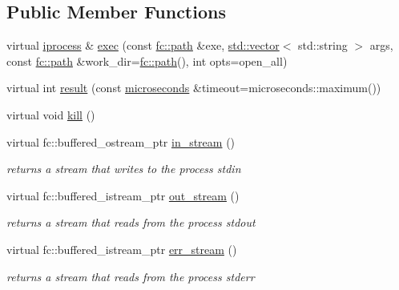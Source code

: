 \subsection*{Public Member Functions}
\begin{DoxyCompactItemize}
\item 
virtual \mbox{\hyperlink{classfc_1_1iprocess}{iprocess}} \& \mbox{\hyperlink{classfc_1_1process_aa663b2fe8d58228224d0c1a954554a46}{exec}} (const \mbox{\hyperlink{classfc_1_1path}{fc\+::path}} \&exe, \mbox{\hyperlink{classstd_1_1vector}{std\+::vector}}$<$ std\+::string $>$ args, const \mbox{\hyperlink{classfc_1_1path}{fc\+::path}} \&work\+\_\+dir=\mbox{\hyperlink{classfc_1_1path}{fc\+::path}}(), int opts=open\+\_\+all)
\item 
virtual int \mbox{\hyperlink{classfc_1_1process_a58711b1b058e41f8139a971d3cc9b0a4}{result}} (const \mbox{\hyperlink{classfc_1_1microseconds}{microseconds}} \&timeout=microseconds\+::maximum())
\item 
virtual void \mbox{\hyperlink{classfc_1_1process_a159c67b1fcff5dffb6678d15090ab335}{kill}} ()
\item 
\mbox{\label{classfc_1_1process_a87f8951f9911b85a30947ad641ae959a}} 
virtual fc\+::buffered\+\_\+ostream\+\_\+ptr \mbox{\hyperlink{classfc_1_1process_a87f8951f9911b85a30947ad641ae959a}{in\+\_\+stream}} ()
\begin{DoxyCompactList}\small\item\em returns a stream that writes to the process\textquotesingle{} stdin \end{DoxyCompactList}\item 
\mbox{\label{classfc_1_1process_a9cda12fc9cb8b8f8181af7603395c384}} 
virtual fc\+::buffered\+\_\+istream\+\_\+ptr \mbox{\hyperlink{classfc_1_1process_a9cda12fc9cb8b8f8181af7603395c384}{out\+\_\+stream}} ()
\begin{DoxyCompactList}\small\item\em returns a stream that reads from the process\textquotesingle{} stdout \end{DoxyCompactList}\item 
\mbox{\label{classfc_1_1process_ae2939ac9bd82790db5f386b13b365549}} 
virtual fc\+::buffered\+\_\+istream\+\_\+ptr \mbox{\hyperlink{classfc_1_1process_ae2939ac9bd82790db5f386b13b365549}{err\+\_\+stream}} ()
\begin{DoxyCompactList}\small\item\em returns a stream that reads from the process\textquotesingle{} stderr \end{DoxyCompactList}\end{DoxyCompactItemize}

